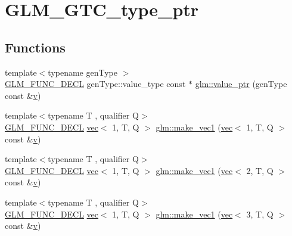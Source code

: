 \hypertarget{group__gtc__type__ptr}{}\section{G\+L\+M\+\_\+\+G\+T\+C\+\_\+type\+\_\+ptr}
\label{group__gtc__type__ptr}
\subsection*{Functions}
\begin{DoxyCompactItemize}
\item 
{\footnotesize template$<$typename gen\+Type $>$ }\\\mbox{\hyperlink{setup_8hpp_ab2d052de21a70539923e9bcbf6e83a51}{G\+L\+M\+\_\+\+F\+U\+N\+C\+\_\+\+D\+E\+CL}} gen\+Type\+::value\+\_\+type const  $\ast$ \mbox{\hyperlink{group__gtc__type__ptr_ga1c64669e1ba1160ad9386e43dc57569a}{glm\+::value\+\_\+ptr}} (gen\+Type const \&\mbox{\hyperlink{_s_d_l__opengl_8h_a10a82eabcb59d2fcd74acee063775f90}{v}})
\item 
{\footnotesize template$<$typename T , qualifier Q$>$ }\\\mbox{\hyperlink{setup_8hpp_ab2d052de21a70539923e9bcbf6e83a51}{G\+L\+M\+\_\+\+F\+U\+N\+C\+\_\+\+D\+E\+CL}} \mbox{\hyperlink{structglm_1_1vec}{vec}}$<$ 1, T, Q $>$ \mbox{\hyperlink{group__gtc__type__ptr_ga4135f03f3049f0a4eb76545c4967957c}{glm\+::make\+\_\+vec1}} (\mbox{\hyperlink{structglm_1_1vec}{vec}}$<$ 1, T, Q $>$ const \&\mbox{\hyperlink{_s_d_l__opengl_8h_a10a82eabcb59d2fcd74acee063775f90}{v}})
\item 
{\footnotesize template$<$typename T , qualifier Q$>$ }\\\mbox{\hyperlink{setup_8hpp_ab2d052de21a70539923e9bcbf6e83a51}{G\+L\+M\+\_\+\+F\+U\+N\+C\+\_\+\+D\+E\+CL}} \mbox{\hyperlink{structglm_1_1vec}{vec}}$<$ 1, T, Q $>$ \mbox{\hyperlink{group__gtc__type__ptr_ga13c92b81e55f201b052a6404d57da220}{glm\+::make\+\_\+vec1}} (\mbox{\hyperlink{structglm_1_1vec}{vec}}$<$ 2, T, Q $>$ const \&\mbox{\hyperlink{_s_d_l__opengl_8h_a10a82eabcb59d2fcd74acee063775f90}{v}})
\item 
{\footnotesize template$<$typename T , qualifier Q$>$ }\\\mbox{\hyperlink{setup_8hpp_ab2d052de21a70539923e9bcbf6e83a51}{G\+L\+M\+\_\+\+F\+U\+N\+C\+\_\+\+D\+E\+CL}} \mbox{\hyperlink{structglm_1_1vec}{vec}}$<$ 1, T, Q $>$ \mbox{\hyperlink{group__gtc__type__ptr_ga3c23cc74086d361e22bbd5e91a334e03}{glm\+::make\+\_\+vec1}} (\mbox{\hyperlink{structglm_1_1vec}{vec}}$<$ 3, T, Q $>$ const \&\mbox{\hyperlink{_s_d_l__opengl_8h_a10a82eabcb59d2fcd74acee063775f90}{v}})

\end{DoxyCompactItemize}
